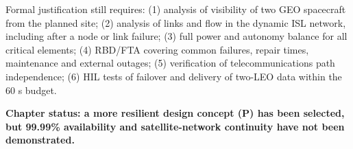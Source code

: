 Formal justification still requires: (1) analysis of visibility of two GEO spacecraft from the planned site; (2) analysis of links and flow in the dynamic ISL network, including after a node or link failure; (3) full power and autonomy balance for all critical elements; (4) RBD/\allowbreak{}FTA covering common failures, repair times, maintenance and external outages; (5) verification of telecommunications path independence; (6) HIL tests of failover and delivery of two-LEO data within the 60 s budget.

\textbf{Chapter status: a more resilient design concept (P) has been selected, but 99.99\% availability and satellite-network continuity have not been demonstrated.}

\par\noindent{\color{TableBorderBlue}\rule{\linewidth}{0.4pt}}\par
